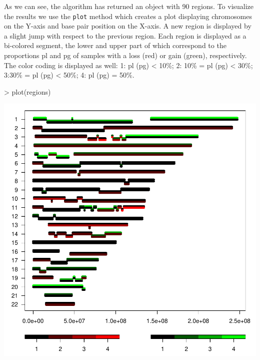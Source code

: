 \documentclass[11pt]{article}
\begin{document}
\noindent 
As we can see, the algorithm has returned an object with 90 regions. 
To visualize the results we use the {\tt plot} method which creates a plot displaying chromosomes on the Y-axis and base pair position on the X-axis. A new region is displayed by a slight jump with respect to the previous region. Each region is displayed as a bi-colored segment, the lower and upper part of which correspond to the proportions pl and pg of samples with a loss (red) or gain (green), respectively. The color coding is displayed as well: 1: pl (pg) < 10\%; 2: 10\% = pl (pg) < 30\%; 3:30\% = pl (pg) < 50\%; 4: pl (pg) = 50\%.

\begin{center}
\begin{Schunk}
\begin{Sinput}
> plot(regions)
\end{Sinput}
\end{Schunk}
\includegraphics{CGHregions-003}
\end{center}

\pagebreak



\end{document}
